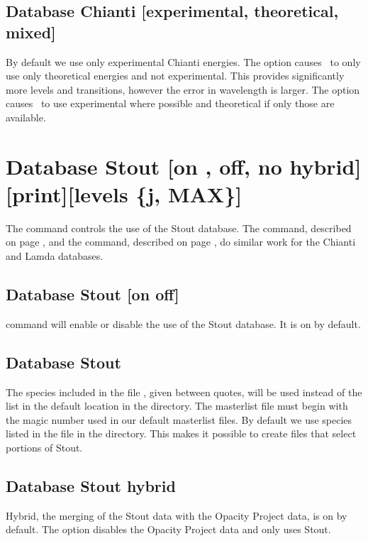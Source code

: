 \subsection{Database Chianti [experimental, theoretical, mixed]}
\label{sec:AtomChiantiExperimental}
By default we use only experimental Chianti energies.
The  option causes \Cloudy\ to only use only theoretical 
energies and not experimental.
This provides significantly more levels and transitions, 
however the error in wavelength is larger.
The  option causes \Cloudy\ to use experimental where
possible and theoretical if only those are available.

\section{Database Stout [on , off, no hybrid][print][levels \{j, MAX\}]}
\label{sec:SetStout}
The command controls the use of the Stout database.
The  command, described on page \pageref{sec:SetChianti},
and the  command, described on page \pageref{sec:SetLamda},
do similar work for the Chianti and Lamda databases.

\subsection{Database Stout [on off]} 
command will enable or disable the use of the Stout database.
It is on by default.

\subsection{Database Stout }
The species included in the file , given between quotes, will be used
instead of the list in the default location in the  directory.
The masterlist file must begin with the magic number used in our default masterlist files.
By default we use species listed in the  file in the 
 directory.
This makes it possible to create  files that select portions of Stout.

\subsection{Database Stout hybrid} 
Hybrid, the merging of the Stout data with the Opacity Project data, 
is on by default.
The  option disables the Opacity Project data 
and only uses Stout.

